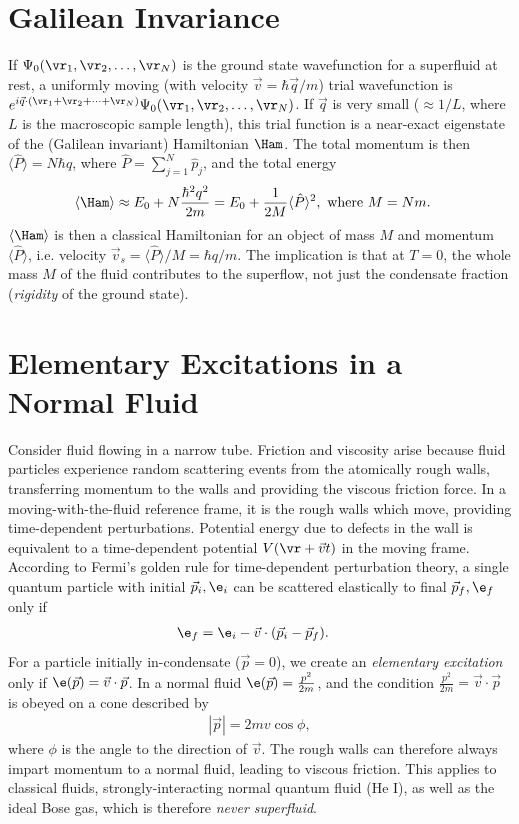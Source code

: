 \documentclass[a4paper, 11pt, normalem]{report}
\begin{document}
\section{Galilean Invariance}
If $\Psi_0(\vr_1,\vr_2,\dots,\vr_N)$ is the ground state wavefunction for a superfluid at rest, a uniformly moving (with velocity $\vec{v}=\hbar\vec{q}/m$) trial wavefunction is $e^{i\vec{q}\cdot(\vr_1+\vr_2+\cdots+\vr_N)}\Psi_0(\vr_1,\vr_2,\dots,\vr_N)$.
If $\vec{q}$ is very small ($\approx 1/L$, where $L$ is the macroscopic sample length), this trial function is a near-exact eigenstate of the (Galilean invariant) Hamiltonian $\Ham$.
The total momentum is then $\langle\hat{P}\rangle=N\hbar q$, where $\hat{P}=\sum_{j=1}^N \hat{p}_j$, and the total energy
\begin{align}
    \langle\Ham\rangle &\approx E_0 + N\frac{\hbar^2 q^2}{2m} = E_0 + \frac{1}{2M}\langle\hat{P}\rangle^2, \text{ where } M = Nm.
\end{align}
$\langle\Ham\rangle$ is then a classical Hamiltonian for an object of mass $M$ and momentum $\langle\hat{P}\rangle$, i.e. velocity $\vec{v}_s=\langle\hat{P}\rangle/M=\hbar q/m$.
The implication is that at $T=0$, the whole mass $M$ of the fluid contributes to the superflow, not just the condensate fraction (\emph{rigidity} of the ground state).

\section{Elementary Excitations in a Normal Fluid}
Consider fluid flowing in a narrow tube.
Friction and viscosity arise because fluid particles experience random scattering events from the atomically rough walls, transferring momentum to the walls and providing the viscous friction force.
In a moving-with-the-fluid reference frame, it is the rough walls which move, providing time-dependent perturbations.
Potential energy due to defects in the wall is equivalent to a time-dependent potential $V(\vr+\vec{v}t)$ in the moving frame.
According to Fermi's golden rule for time-dependent perturbation theory, a single quantum particle with initial $\vec{p}_i,\e_i$ can be scattered elastically to final $\vec{p}_f,\e_f$ only if
\begin{align}
    \e_f &= \e_i-\vec{v}\cdot(\vec{p}_i-\vec{p}_f).
\end{align}
For a particle initially in-condensate ($\vec{p}=0$), we create an \emph{elementary excitation} only if $\e(\vec{p})=\vec{v}\cdot\vec{p}$.
In a normal fluid $\e(\vec{p})=\frac{p^2}{2m}$, and the condition $\frac{p^2}{2m}=\vec{v}\cdot\vec{p}$ is obeyed on a cone described by
\begin{align}
    |\vec{p}| = 2mv\cos\phi,
\end{align}
where $\phi$ is the angle to the direction of $\vec{v}$.
The rough walls can therefore always impart momentum to a normal fluid, leading to viscous friction.
This applies to classical fluids, strongly-interacting normal quantum fluid (He I), as well as the ideal Bose gas, which is therefore \emph{never superfluid}.
\end{document}
